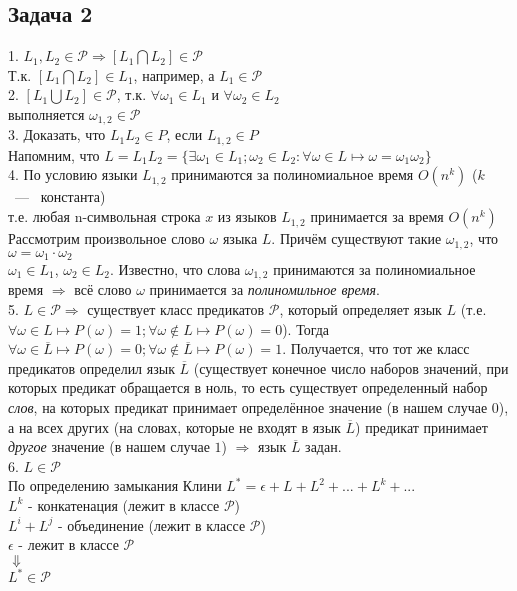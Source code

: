 \documentclass[12pt]{report}
\begin{document}
	\subsection*{Задача 2}
		1. $L_{1}, L_{2} \in \mathcal{P} \Rightarrow [L_{1} \bigcap L_{2}] \in \mathcal{P}$\\
		Т.к. $[L_{1} \bigcap L_{2}] \in L_{1}$, например, а $L_{1} \in \mathcal{P}$ \\
		2. $[L_{1} \bigcup L_{2}] \in \mathcal{P}$, т.к. $\forall \omega_{1} \in L_{1}$ и $\forall \omega_{2} \in L_{2}$\\
		выполняется $\omega_{1,2} \in \mathcal{P}$\\
		3. Доказать, что $L_{1}L_{2} \in P$, если $L_{1,2} \in P$\\
		Напомним, что $L = L_{1}L_{2} = \{\exists \omega_{1} \in L_{1}; \omega_{2} \in L_{2}: \forall \omega \in L \longmapsto \omega = \omega_{1}\omega_{2} \}$ \\
		4. По условию языки $L_{1, 2}$ принимаются за полиномиальное время $O(n^{k})$ ($k$ ~---~ константа) \\
		т.е. любая n-символьная строка $x$ из языков $L_{1,2}$ принимается за время $O(n^{k})$\\
		Рассмотрим произвольное слово $\omega$ языка $L$. Причём существуют такие $\omega_{1,2}$, что $\omega = \omega_{1}\cdot\omega_{2}$\\
		$\omega_{1} \in L_{1}$, $\omega_{2} \in L_{2}$. Известно, что слова $\omega_{1, 2}$ принимаются за полиномиальное время $\Rightarrow$ всё слово $\omega$ принимается за \textit{полиномильное время}.\\
		5. $L \in \mathcal{P} \Rightarrow$ существует класс предикатов $\mathcal{P}$, который определяет язык $L$ (т.е. $\forall \omega \in L \longmapsto P(\omega) = 1; \forall \omega \notin L \longmapsto P(\omega) = 0$). Тогда $\forall \omega \in \overline{L} \longmapsto P(\omega) = 0; \forall \omega \notin \overline{L} \longmapsto P(\omega) = 1$. Получается, что
		тот же класс предикатов определил язык $\overline{L}$ (существует конечное число наборов значений, при которых предикат обращается в ноль, то есть существует определенный набор \textit{слов}, на которых предикат принимает определённое значение (в нашем случае $0$), а на всех других (на словах, которые не входят в язык $\overline{L}$) предикат принимает \textit{другое} значение (в нашем случае $1$) $\Rightarrow$ язык $\overline{L}$ задан.\\
		6. $L \in \mathcal{P}$\\
		По определению замыкания Клини $L^{*} = \epsilon + L + L^{2} + ... + L^{k} + ...$ \\		
		$L^{k}$ - конкатенация (лежит в классе $\mathcal{P}$)\\
		$L^{i} + L^{j}$ - объединение (лежит в классе $\mathcal{P}$)\\
		$\epsilon$ - лежит в классе $\mathcal{P}$\\
		$\Downarrow$\\
		$L^{*} \in \mathcal{P}$ 	
\end{document}
